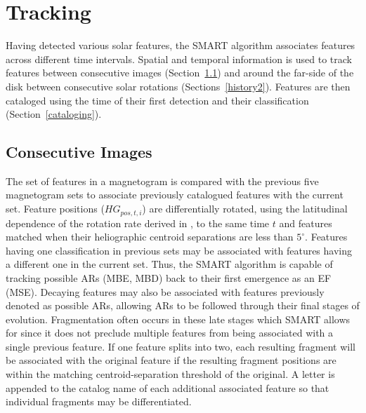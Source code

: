 \section{Tracking}\label{tracking}

Having detected various solar features, the \gls{SMART} algorithm associates features across different time intervals. 
Spatial and temporal information is used to track features between consecutive images (Section~\ref{history}) and around the far-side of the disk between consecutive solar rotations (Sections~\ref{history2}). Features are then cataloged using the time of their first detection and their classification (Section~\ref{cataloging}). 

\subsection{Consecutive Images}\label{history}

The set of features in a magnetogram is compared with the previous five magnetogram sets to associate previously catalogued features with the current set. Feature positions ($HG_{pos,t,i}$) are differentially rotated, using the latitudinal dependence of the rotation rate derived in \citet{Howard:1990}, to the same time $t$ and features matched when their heliographic centroid separations are less than $5^\circ$. Features having one classification in previous sets may be associated with features having a different one in the current set. Thus, the \gls{SMART} algorithm is capable of tracking possible \glspl{AR} (MBE, MBD) back to their first emergence as an EF (MSE). Decaying features may also be associated with features previously denoted as possible \glspl{AR}, allowing \glspl{AR} to be followed through their final stages of evolution.
Fragmentation often occurs in these late stages which \gls{SMART} allows for since it does not preclude multiple features from being associated with a single previous feature. If one feature splits into two, each resulting fragment will be associated with the original feature if the resulting fragment positions are within the matching centroid-separation threshold of the original. A letter is appended to the catalog name of each additional associated feature so that individual fragments may be differentiated. 

